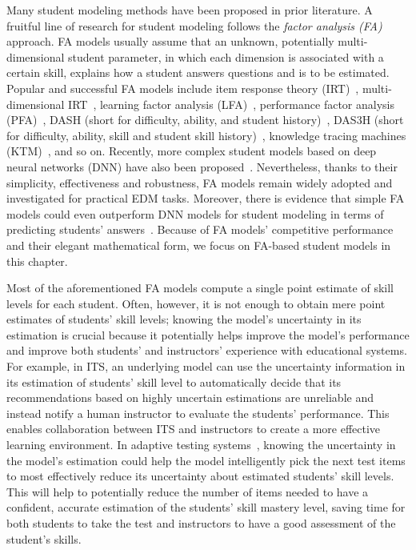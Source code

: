 \sloppy
Many student modeling methods have been proposed in prior literature. A fruitful line of research for student modeling follows the \textit{factor analysis (FA)} approach.
FA models usually assume that an unknown, potentially multi-dimensional student parameter, in which each dimension is associated with a certain skill, explains how a student answers questions and is to be estimated. Popular and successful FA models include item response theory (IRT)~\cite{irt}, multi-dimensional IRT~\cite{mirt}, learning factor analysis (LFA)~\cite{LFA}, performance factor analysis (PFA)~\cite{PFA}, DASH (short for {d}ifficulty, {a}bility, and {s}tudent {h}istory)~\cite{lindsey2014improving,mozer2016predicting}, DAS3H (short for {d}ifficulty, {a}bility, {s}kill and {s}tudent {s}kill {h}istory)~\cite{das3h}, knowledge tracing machines (KTM)~\cite{vie2019knowledge}, and so on.
% 
Recently, more complex student models based on deep neural networks (DNN) have
also been proposed~\cite{DKT,zhang2017dynamic,minn2018deep}. Nevertheless,
thanks to their simplicity, effectiveness and robustness, FA models remain
widely adopted and investigated for practical EDM tasks. Moreover, there is
evidence that simple FA models could even outperform DNN models for student
modeling in terms of predicting students' answers~\cite{irt-best}. Because of
FA models' competitive performance and their elegant mathematical form, we focus
on FA-based student models in this chapter.

Most of the aforementioned FA models compute a single point estimate of skill
levels for each student. Often, however, it is not enough to obtain mere point
estimates of students' skill levels; knowing the model's uncertainty in its
estimation is crucial because it potentially helps improve the model's
performance and improve both students' and instructors' experience with
educational systems.
% 
For example, in ITS, an underlying model can use the uncertainty information in
its estimation of students' skill level to automatically decide that its
recommendations based on highly uncertain estimations are unreliable and
instead notify a human instructor to evaluate the students' performance. This
enables collaboration between ITS and instructors to create a more effective
learning environment.
%
In adaptive testing systems~\cite{chang2009nonlinear,yan2016computerized},
knowing the uncertainty in the model's estimation could help the model
intelligently pick the next test items to most effectively reduce its
uncertainty about estimated students' skill levels. This will help to
potentially reduce the number of items needed to have a confident, accurate
estimation of the students' skill mastery level, saving time for both students
to take the test and instructors to have a good assessment of the student's
skills.

